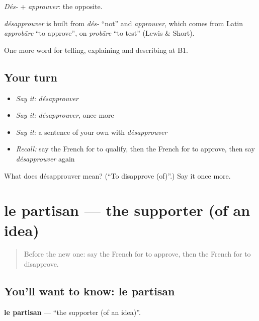 \emph{Dés-} + \emph{approuver}: the opposite.

\begin{cousinweb}
\emph{désapprouver} is built from \emph{dés-} \textquotedblleft{}not\textquotedblright{} and \emph{approuver}, which comes from Latin \emph{approbāre} \textquotedblleft{}to approve\textquotedblright{}, on \emph{probāre} \textquotedblleft{}to test\textquotedblright{} (Lewis \& Short).
\end{cousinweb}

\begin{grammarlens}[title={What you've built}]
One more word for telling, explaining and describing at B1.
\end{grammarlens}

\subsection*{Your turn}
\begin{itemize}
\raggedright
  \item \emph{Say it:} \emph{désapprouver}
  \item \emph{Say it:} \emph{désapprouver}, once more
  \item \emph{Say it:} a sentence of your own with \emph{désapprouver}
  \item \emph{Recall:} say the French for to qualify, then the French for to approve, then say \emph{désapprouver} again
\end{itemize}

\begin{tcolorbox}[breakable,colback=teal!4,colframe=teal!35!black,title={Before you move on}]
What does désapprouver mean? (\textquotedblleft{}To disapprove (of)\textquotedblright{}.) Say it once more.
\end{tcolorbox}
\section[le partisan]{le partisan — the supporter (of an idea)}

\label{lesson:FR-C345-partisan}



\begin{quote}
Before the new one: say the French for to approve, then the French for to disapprove.
\end{quote}

\subsection*{You'll want to know: le partisan}
\textbf{le partisan} — \textquotedblleft{}the supporter (of an idea)\textquotedblright{}.

